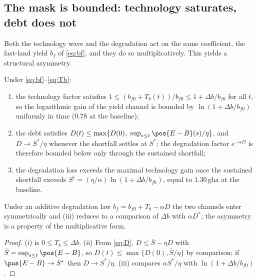 \subsection{The mask is bounded: technology saturates, debt does not}\label{sec:bounded}

Both the technology wave and the degradation act on the same coefficient, the fast-land yield $b_f$ of \eqref{eq:bf}, and they do so multiplicatively. This yields a structural asymmetry.

\begin{proposition}\label{prop:bounded}
Under \eqref{eq:bf}--\eqref{eq:Tb}:
\begin{enumerate}[label=(\roman*)]
\item the technology factor satisfies $1\le(b_{f0}+T_b(t))/b_{f0}\le1+\Delta b/b_{f0}$ for all $t$, so the logarithmic gain of the yield channel is bounded by $\ln(1+\Delta b/b_{f0})$ uniformly in time ($0.78$ at the baseline);
\item the debt satisfies $D(t)\le\max\{D(0),\ \sup_{s\le t}\pos{E-B}(s)/\eta\}$, and $D\to S^*/\eta$ whenever the shortfall settles at $S^*$; the degradation factor $e^{-\alpha D}$ is therefore bounded below only through the sustained shortfall;
\item the degradation loss exceeds the maximal technology gain once the sustained shortfall exceeds $S^\dagger=(\eta/\alpha)\ln(1+\Delta b/b_{f0})$, equal to $1.30\,\mathrm{gha}$ at the baseline.
\end{enumerate}
Under an additive degradation law $b_f=b_{f0}+T_b-\alpha D$ the two channels enter symmetrically and (iii) reduces to a comparison of $\Delta b$ with $\alpha D^*$; the asymmetry is a property of the multiplicative form.
\end{proposition}

\begin{proof}
(i) is $0\le T_b\le\Delta b$. (ii) From \eqref{eq:D}, $\dot D\le\bar S-\eta D$ with $\bar S=\sup_{s\le t}\pos{E-B}$, so $D(t)\le\max\{D(0),\bar S/\eta\}$ by comparison; if $\pos{E-B}\to S^*$ then $D\to S^*/\eta$. (iii) compares $\alpha S^*/\eta$ with $\ln(1+\Delta b/b_{f0})$.
\end{proof}

